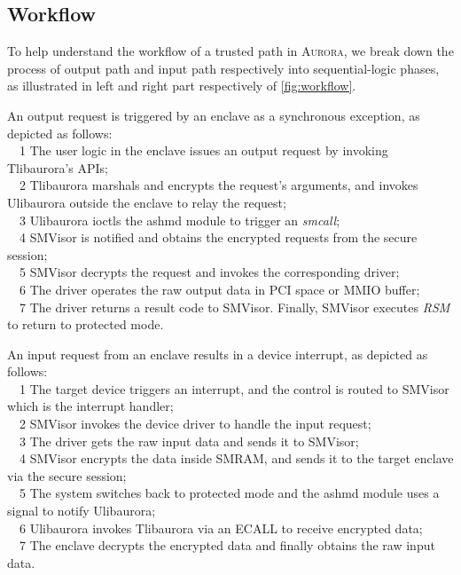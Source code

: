 \subsection{Workflow}\label{workflow}
To help understand the workflow of a trusted path in \textsc{Aurora}, we break down the process of output path and input path respectively into sequential-logic phases, as illustrated in left and right part respectively of \autoref{fig:workflow}.

An output request is triggered by an enclave as a synchronous exception, as depicted as follows:\\
~~\textcircled{\footnotesize{1}} The user logic in the enclave issues an output request by invoking  Tlibaurora's APIs;\\
~~\textcircled{\footnotesize{2}} Tlibaurora marshals and encrypts the request's arguments, and invokes Ulibaurora outside the enclave to relay the request;\\ %
~~\textcircled{\footnotesize{3}} Ulibaurora ioctls the ashmd module to trigger an \textit{smcall};\\
~~\textcircled{\footnotesize{4}} SMVisor is notified and obtains the encrypted requests from the secure session;\\
~~\textcircled{\footnotesize{5}} SMVisor decrypts the request and invokes the corresponding  driver;\\
~~\textcircled{\footnotesize{6}} The driver operates the raw output data in PCI space or MMIO buffer;\\
~~\textcircled{\footnotesize{7}} The driver returns a result code to SMVisor. Finally, SMVisor  executes \textit{RSM} to return to protected mode. \\

\par
An input request from an enclave results in a device interrupt, as depicted as follows:\\
~~\textcircled{\footnotesize{1}} The target device triggers an interrupt, and the control is routed to SMVisor which is the interrupt handler;\\
~~\textcircled{\footnotesize{2}} SMVisor invokes the device driver to handle the input request;\\
~~\textcircled{\footnotesize{3}} The driver gets the raw input data and sends it to SMVisor;\\
~~\textcircled{\footnotesize{4}} SMVisor encrypts the data inside SMRAM, and sends it to the target enclave via the secure session;\\
~~\textcircled{\footnotesize{5}} The system switches back to protected mode and the ashmd module uses a signal to notify Ulibaurora;\\
~~\textcircled{\footnotesize{6}} Ulibaurora invokes Tlibaurora via an ECALL to receive encrypted data;\\
~~\textcircled{\footnotesize{7}} The enclave decrypts the encrypted data and finally obtains the raw input data. %

